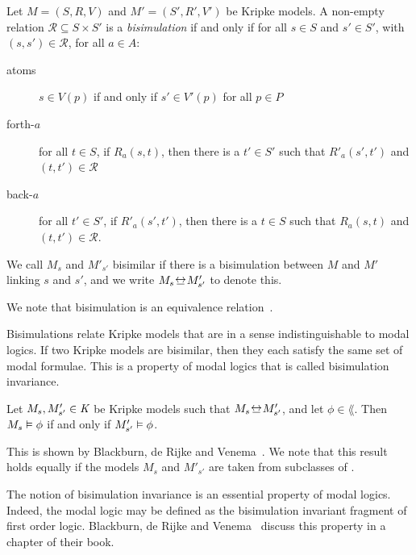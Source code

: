 \begin{definition}[Bisimulation]
Let $M = (S, R, V)$ and $M' = (S', R', V')$ be Kripke models. A non-empty
relation $\mathcal{R} \subseteq S \times S'$ is a \textit{bisimulation} if and
only if for all $s \in S$ and $s' \in S'$, with $(s, s') \in \mathcal{R}$, for
all $a \in A$:

\begin{description}
\item[atoms] $s \in V(p)$ if and only if $s' \in V'(p)$ for all
$p \in P$

\item[forth-$a$] for all $t \in S$, if $R_a(s, t)$, then there is a
$t' \in S'$ such that $R'_a(s', t')$ and $(t,
t') \in \mathcal{R}$

\item[back-$a$] for all $t' \in S'$, if $R'_a(s',
t')$, then there is a $t \in S$ such that $R_a(s, t)$ and $(t, t')
\in \mathcal{R}$.
\end{description}

We call $M_s$ and $M'_{s'}$ bisimilar if there is a bisimulation between $M$ and
$M'$ linking $s$ and $s'$, and we write $M_s \bisim M'_{s'}$ to denote this.
\end{definition}

We note that bisimulation is an equivalence relation~\cite{blackburn2002modal}.

Bisimulations relate Kripke models that are in a sense indistinguishable to
modal logics. If two Kripke models are bisimilar, then they each satisfy the
same set of modal formulae. This is a property of modal logics that is called
bisimulation invariance.

\begin{lemma}
Let $M_s, M'_{s'} \in \textit{K}$ be Kripke models such that $M_s \bisim M'_{s'}$,
and let $\phi \in \lang$. Then $M_s \vDash \phi$ if and only if $M'_{s'}
\vDash \phi$.
\end{lemma}

This is shown by Blackburn, de Rijke and Venema~\cite{blackburn2002modal}. We
note that this result holds equally if the models $M_s$ and $M'_{s'}$ are taken
from subclasses of \classK{}.

The notion of bisimulation invariance is an essential property of modal logics.
Indeed, the modal logic \axiomK{} may be defined as the bisimulation invariant
fragment of first order logic. Blackburn, de Rijke and
Venema~\cite{blackburn2002modal} discuss this property in a chapter of their
book.

